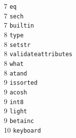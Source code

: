 \begin{footnotesize}
\begin{multicols}{3}
\vspace{-.153cm} 7     \hspace{.2cm} {\tt eq                  }   \\ %
\vspace{-.153cm} 7     \hspace{.2cm} {\tt sech                }   \\ %
\vspace{-.153cm} 7     \hspace{.2cm} {\tt builtin             }   \\ %
\vspace{-.153cm} 8     \hspace{.2cm} {\tt type                }   \\ %
\vspace{-.153cm} 8     \hspace{.2cm} {\tt setstr              }   \\ %
\vspace{-.153cm} 8     \hspace{.2cm} {\tt validateattributes  }   \\ %
\vspace{-.153cm} 8     \hspace{.2cm} {\tt what                }   \\ %
\vspace{-.153cm} 8     \hspace{.2cm} {\tt atand               }   \\ %
\vspace{-.153cm} 9     \hspace{.2cm} {\tt issorted            }   \\ %
\vspace{-.153cm} 9     \hspace{.2cm} {\tt acosh               }   \\ %
\vspace{-.153cm} 9     \hspace{.2cm} {\tt int8                }   \\ %
\vspace{-.153cm} 9     \hspace{.2cm} {\tt light               }   \\ %
\vspace{-.153cm} 9     \hspace{.2cm} {\tt betainc             }   \\ %
\vspace{-.153cm} 10    \hspace{.2cm} {\tt keyboard            }    \\ %

\end{multicols}
\end{footnotesize}
